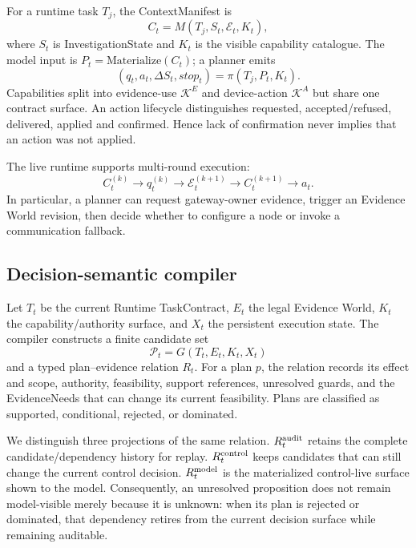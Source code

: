 \documentclass[journal,10pt]{IEEEtran}
\begin{document}
For a runtime task $T_j$, the ContextManifest is
\begin{equation}
C_t=M(T_j,S_t,\mathcal E_t,K_t),
\end{equation}
where $S_t$ is InvestigationState and $K_t$ is the visible capability catalogue. The model input
is $P_t=\mathrm{Materialize}(C_t)$; a planner emits
\begin{equation}
(q_t,a_t,\Delta S_t,stop_t)=\pi(T_j,P_t,K_t).
\label{eq:planner}
\end{equation}
Capabilities split into evidence-use $\mathcal K^E$ and device-action $\mathcal K^A$ but share one
contract surface. An action lifecycle distinguishes requested, accepted/refused, delivered,
applied and confirmed. Hence lack of confirmation never implies that an action was not applied.

The live runtime supports multi-round execution:
\begin{equation}
C_t^{(k)}\rightarrow q_t^{(k)}\rightarrow \mathcal E_t^{(k+1)}
\rightarrow C_t^{(k+1)}\rightarrow a_t.
\label{eq:multiround}
\end{equation}
In particular, a planner can request gateway-owner evidence, trigger an Evidence World revision,
then decide whether to configure a node or invoke a communication fallback.


\subsection{Decision-semantic compiler}
Let $T_t$ be the current Runtime TaskContract, $E_t$ the legal Evidence World, $K_t$ the
capability/authority surface, and $X_t$ the persistent execution state. The compiler constructs a
finite candidate set
\begin{equation}
\mathcal P_t=G(T_t,E_t,K_t,X_t)
\end{equation}
and a typed plan--evidence relation $R_t$. For a plan $p$, the relation records its effect and
scope, authority, feasibility, support references, unresolved guards, and the EvidenceNeeds that
can change its current feasibility. Plans are classified as supported, conditional, rejected, or
dominated.

We distinguish three projections of the same relation. $R_t^{\rm audit}$ retains the complete
candidate/dependency history for replay. $R_t^{\rm control}$ keeps candidates that can still
change the current control decision. $R_t^{\rm model}$ is the materialized control-live surface
shown to the model. Consequently, an unresolved proposition does not remain model-visible merely
because it is unknown: when its plan is rejected or dominated, that dependency retires from the
current decision surface while remaining auditable.
\end{document}
